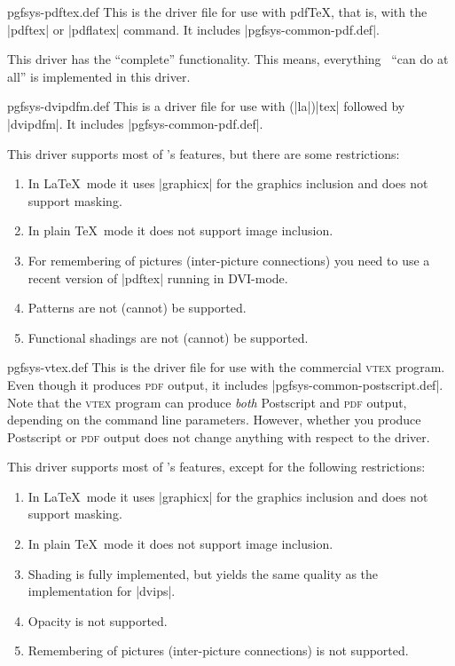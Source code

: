 \begin{filedescription}{pgfsys-pdftex.def}
  This is the driver file for use with pdf\TeX, that is, with the
  |pdftex| or |pdflatex| command. It includes
  |pgfsys-common-pdf.def|.

  This driver has the ``complete'' functionality. This means,
  everything \pgfname\ ``can do at all'' is implemented in this
  driver. 
\end{filedescription}

\begin{filedescription}{pgfsys-dvipdfm.def}
  This is a driver file for use with (|la|)|tex| followed by |dvipdfm|. It
  includes |pgfsys-common-pdf.def|.

  This driver supports most of \pgfname's features, but there are some
  restrictions:
  \begin{enumerate}
  \item
    In \LaTeX\ mode it uses |graphicx| for the graphics
    inclusion and does not support masking.
  \item
    In plain \TeX\ mode it does not support image inclusion.
  \item
    For remembering of pictures (inter-picture connections) you need
    to use a recent version of |pdftex| running in DVI-mode.
  \item
    Patterns are not (cannot) be supported.
  \item
    Functional shadings are not (cannot) be supported.
  \end{enumerate}
\end{filedescription}

\begin{filedescription}{pgfsys-vtex.def}
  This is the driver file for use with the commercial \textsc{vtex}
  program. Even though it produces  \textsc{pdf} output, it
  includes |pgfsys-common-postscript.def|. Note that the
  \textsc{vtex} program can produce \emph{both} Postscript and
  \textsc{pdf} output, depending on the command line
  parameters. However, whether you produce Postscript or
  \textsc{pdf} output does not change anything with respect to the
  driver. 

  This driver supports most of \pgfname's features, except for
  the following restrictions:
  \begin{enumerate}
  \item
    In \LaTeX\ mode it uses |graphicx| for the graphics
    inclusion and does not support masking.
  \item
    In plain \TeX\ mode it does not support image inclusion.
  \item
    Shading is fully implemented, but yields the same quality as the
    implementation for |dvips|.
  \item
    Opacity is not supported.
  \item
    Remembering of pictures (inter-picture connections) is not
    supported. 
  \end{enumerate}
\end{filedescription}

